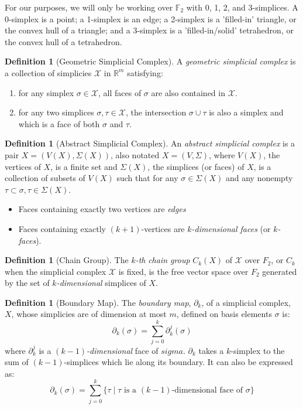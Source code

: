 \documentclass[ma]{uncgdissertationexp}
\theoremstyle{plain}
\theoremstyle{definition}
\newtheorem{definition}[theorem]{Definition}
\theoremstyle{remark}
\begin{document}
\par For our purposes, we will only be working over $\mathbb{F}_2$ with 0, 1, 2, and 3-simplices. A 0-simplex is a point; a 1-simplex is an edge; a 2-simplex is a 'filled-in' triangle, or the convex hull of a triangle; and a 3-simplex is a 'filled-in/solid' tetrahedron, or the convex hull of a tetrahedron.

\begin{definition}[Geometric Simplicial Complex]
A \textit{geometric simplicial complex} is a collection of simplicies $\mathcal{X}$ in $\mathbb{R}^m$ satisfying:
\begin{enumerate}
\item for any simplex $\sigma \in \mathcal{X}$, all faces of $\sigma$ are also contained in $\mathcal{X}$.
\item for any two simplices $\sigma, \tau \in \mathcal{X}$, the intersection $\sigma \cup \tau$ is also a simplex and which is a face of both $
\sigma$ and $\tau$. 
\end{enumerate}
\end{definition}

\begin{definition}[Abstract Simplicial Complex]
An \textit{abstract simplicial complex} is a pair $X = (V(X), \Sigma(X))$, also notated $X=(V,\Sigma)$, where $V(X)$, the vertices of $X$, is a finite set and $\Sigma(X)$, the simplices (or faces) of $X$, is a collection of subsets of $V(X)$ such that for any $\sigma \in \Sigma(X)$ and any nonempty $\tau \subset \sigma, \tau \in \Sigma(X)$.
\begin{itemize}
\item Faces containing exactly two vertices are \textit{edges}
\item Faces containing exactly $(k+1)$-vertices are $k$\textit{-dimensional faces} (or $k$\textit{-faces}).
\end{itemize}
\end{definition}

\begin{definition}[Chain Group]
The $k$\textit{-th} \textit{chain group} $C_k(X)$ of $\mathcal{X}$ over $F_2$, or $C_k$ when the simplicial complex $\mathcal{X}$ is fixed, is the free vector space over $F_2$ generated by the set of $k$\textit{-dimensional} simplices of $X$.
\end{definition}

\begin{definition}[Boundary Map]
The \textit{boundary map}, $\partial_{k}$, of a simplicial complex, $X$, whose simplicies are of dimension at most $m$, defined on basis elements $\sigma$ is:
$$\partial_{k}(\sigma)=\sum^{k}_{j=0}\partial^{j}_{k}(\sigma)$$
where $\partial^{j}_{k}$ is a $(k-1)$\textit{-dimensional} face of $sigma$. $\partial_{k}$ takes a $k$-simplex to the sum of $(k-1)$-simplices which lie along its boundary. It can also be expressed as:
$$\partial_{k}(\sigma)=\sum^{k}_{j=0}\big\{\tau \mid \tau \text{ is a }(k-1)\text{-dimensional face of } \sigma \big\}$$
\end{definition}
\end{document}
